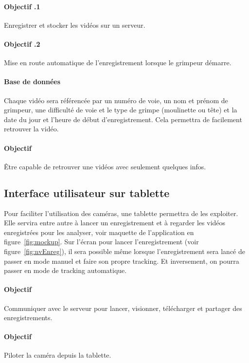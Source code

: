 \documentclass[a4paper, 11pt, french]{article}
\newcounter{obj}
\begin{document}
\paragraph*{Objectif \theobj.1} Enregistrer et stocker les vidéos sur un serveur.
\paragraph*{Objectif \theobj.2} Mise en route automatique de l'enregistrement lorsque le grimpeur démarre.

\paragraph*{Base de données}
Chaque vidéo sera référencée par un numéro de voie, un nom et prénom de grimpeur, une difficulté de voie et le type de grimpe (moulinette ou tête) et la date du jour et l'heure de début d'enregistrement. Cela permettra de facilement retrouver la vidéo. 

\paragraph*{Objectif \theobj} Être capable de retrouver une vidéos avec seulement quelques infos. 

\subsection{Interface utilisateur sur tablette\label{sec:UX}}
Pour faciliter l'utilisation des caméras, une tablette permettra de les exploiter. Elle servira entre autre à lancer un enregistrement et à regarder les vidéos enregistrées pour les analyser, voir maquette de l'application en figure~\ref{fig:mockup}. Sur l'écran pour lancer l'enregistrement (voir figure~\ref{fig:nvEnreg}), il sera possible même lorsque l'enregistrement sera lancé de passer en mode manuel et faire son propre tracking. Et inversement, on pourra passer en mode de tracking automatique. 

\paragraph*{Objectif \theobj} Communiquer avec le serveur pour lancer, visionner, télécharger et partager des enregistrements.

\paragraph*{Objectif \theobj} Piloter la caméra depuis la tablette. 
\end{document}
